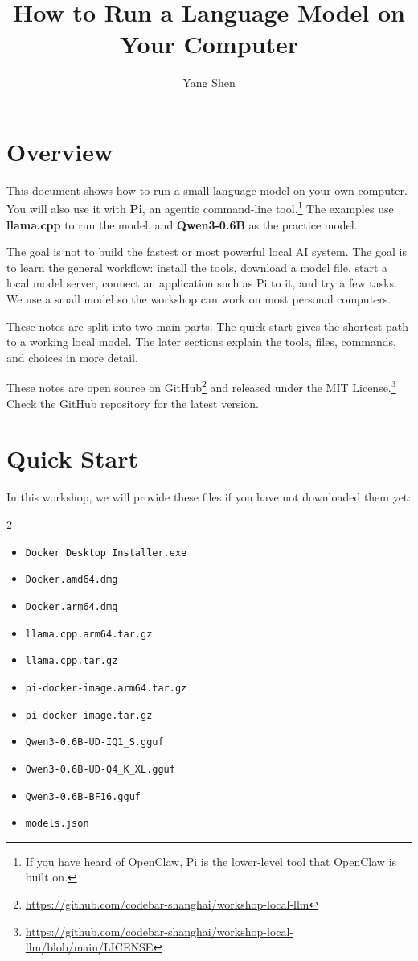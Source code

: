 \documentclass[a4paper,12pt]{article}
\title{How to Run a Language Model on Your Computer}
\author{Yang Shen}
\date{}
\begin{document}
\maketitle

\section{Overview}

This document shows how to run a small language model on your own computer. You will also use it with \textbf{Pi}, an agentic command-line tool.\footnote{If you have heard of OpenClaw, Pi is the lower-level tool that OpenClaw is built on.} The examples use \textbf{llama.cpp} to run the model, and \textbf{Qwen3-0.6B} as the practice model.

The goal is not to build the fastest or most powerful local AI system. The goal is to learn the general workflow: install the tools, download a model file, start a local model server, connect an application such as Pi to it, and try a few tasks. We use a small model so the workshop can work on most personal computers.

These notes are split into two main parts. The quick start gives the shortest path to a working local model. The later sections explain the tools, files, commands, and choices in more detail.

These notes are open source on GitHub\footnote{\url{https://github.com/codebar-shanghai/workshop-local-llm}} and released under the MIT License.\footnote{\url{https://github.com/codebar-shanghai/workshop-local-llm/blob/main/LICENSE}} Check the GitHub repository for the latest version.

\section{Quick Start}

In this workshop, we will provide these files if you have not downloaded them yet:

\begin{multicols}{2}
\begin{itemize}
\item \texttt{Docker Desktop Installer.exe}
\item \texttt{Docker.amd64.dmg}
\item \texttt{Docker.arm64.dmg}
\item \texttt{llama.cpp.arm64.tar.gz}
\item \texttt{llama.cpp.tar.gz}
\item \texttt{pi-docker-image.arm64.tar.gz}
\item \texttt{pi-docker-image.tar.gz}
\item \verb|Qwen3-0.6B-UD-IQ1_S.gguf|
\item \verb|Qwen3-0.6B-UD-Q4_K_XL.gguf|
\item \texttt{Qwen3-0.6B-BF16.gguf}
\item \texttt{models.json}
\end{itemize}
\end{multicols}
\end{document}
